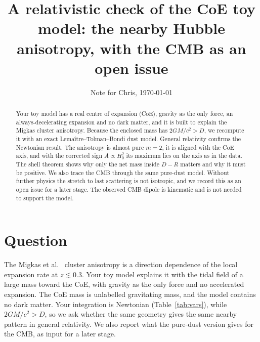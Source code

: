 \documentclass[10pt,twocolumn,letterpaper]{article}
\title{\vspace{-0.6in}\Large A relativistic check of the CoE toy model: the nearby Hubble anisotropy, with the CMB as an open issue}
\author{Note for Chris, \today}
\date{\vspace{-0.35in}}
\begin{document}
\maketitle

\begin{abstract}\noindent
Your toy model has a real centre of expansion (CoE), gravity as the only force, an always-decelerating expansion and no dark matter, and it is built to explain the Migkas cluster anisotropy. Because the enclosed mass has $2GM/c^2>D$, we recompute it with an exact Lema\^itre--Tolman--Bondi dust model. General relativity confirms the Newtonian result. The anisotropy is almost pure $m=2$, it is aligned with the CoE axis, and with the corrected sign $A\propto H_0^2$ its maximum lies on the axis as in the data. The shell theorem shows why only the net mass inside $D-R$ matters and why it must be positive. We also trace the CMB through the same pure-dust model. Without further physics the stretch to last scattering is not isotropic, and we record this as an open issue for a later stage. The observed CMB dipole is kinematic and is not needed to support the model.
\end{abstract}

\section{Question}
The Migkas et al.\ \cite{Migkas2020,Migkas2021} cluster anisotropy is a direction dependence of the local expansion rate at $z\lesssim0.3$. Your toy model explains it with the tidal field of a large mass toward the CoE, with gravity as the only force and no accelerated expansion. The CoE mass is unlabelled gravitating mass, and the model contains no dark matter. Your integration is Newtonian (Table~\ref{tab:vars}), while $2GM/c^2>D$, so we ask whether the same geometry gives the same nearby pattern in general relativity. We also report what the pure-dust version gives for the CMB, as input for a later stage.
\end{document}

